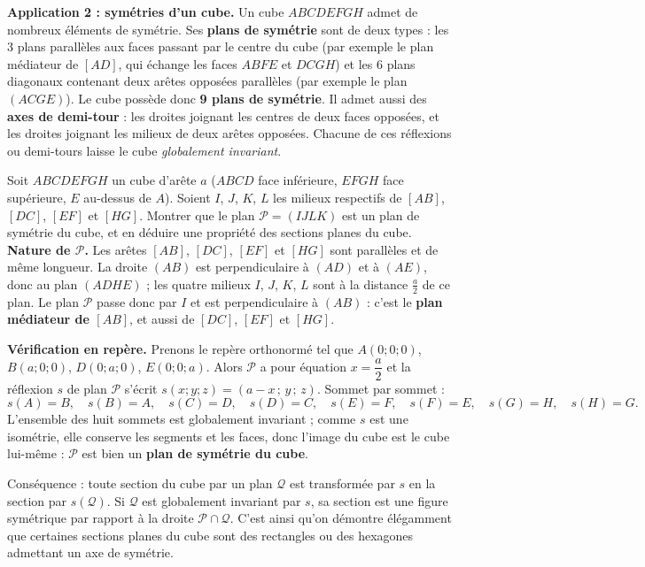 \documentclass[11pt]{article}
\begin{document}
\textbf{Application 2 : symétries d'un cube.} Un cube $ABCDEFGH$ admet de nombreux éléments de symétrie. Ses \textbf{plans de symétrie} sont de deux types : les 3 plans parallèles aux faces passant par le centre du cube (par exemple le plan médiateur de $[AD]$, qui échange les faces $ABFE$ et $DCGH$) et les 6 plans diagonaux contenant deux arêtes opposées parallèles (par exemple le plan $(ACGE)$). Le cube possède donc \textbf{9 plans de symétrie}. Il admet aussi des \textbf{axes de demi-tour} : les droites joignant les centres de deux faces opposées, et les droites joignant les milieux de deux arêtes opposées. Chacune de ces réflexions ou demi-tours laisse le cube \emph{globalement invariant}.

\begin{exoresolu}
Soit $ABCDEFGH$ un cube d'arête $a$ ($ABCD$ face inférieure, $EFGH$ face supérieure, $E$ au-dessus de $A$). Soient $I$, $J$, $K$, $L$ les milieux respectifs de $[AB]$, $[DC]$, $[EF]$ et $[HG]$. Montrer que le plan $\mathcal{P} = (IJLK)$ est un plan de symétrie du cube, et en déduire une propriété des sections planes du cube.
\tcblower
\textbf{Nature de $\mathcal{P}$.} Les arêtes $[AB]$, $[DC]$, $[EF]$ et $[HG]$ sont parallèles et de même longueur. La droite $(AB)$ est perpendiculaire à $(AD)$ et à $(AE)$, donc au plan $(ADHE)$ ; les quatre milieux $I$, $J$, $K$, $L$ sont à la distance $\frac{a}{2}$ de ce plan. Le plan $\mathcal{P}$ passe donc par $I$ et est perpendiculaire à $(AB)$ : c'est le \textbf{plan médiateur de $[AB]$}, et aussi de $[DC]$, $[EF]$ et $[HG]$.

\textbf{Vérification en repère.} Prenons le repère orthonormé tel que $A(0;0;0)$, $B(a;0;0)$, $D(0;a;0)$, $E(0;0;a)$. Alors $\mathcal{P}$ a pour équation $x = \dfrac{a}{2}$ et la réflexion $s$ de plan $\mathcal{P}$ s'écrit $s(x;y;z) = (a - x\,;\,y\,;\,z)$. Sommet par sommet :
\[
s(A) = B,\quad s(B) = A,\quad s(C) = D,\quad s(D) = C,\quad s(E) = F,\quad s(F) = E,\quad s(G) = H,\quad s(H) = G.
\]
L'ensemble des huit sommets est globalement invariant ; comme $s$ est une isométrie, elle conserve les segments et les faces, donc l'image du cube est le cube lui-même : $\mathcal{P}$ est bien un \textbf{plan de symétrie du cube}.

Conséquence : toute section du cube par un plan $\mathcal{Q}$ est transformée par $s$ en la section par $s(\mathcal{Q})$. Si $\mathcal{Q}$ est globalement invariant par $s$, sa section est une figure symétrique par rapport à la droite $\mathcal{P} \cap \mathcal{Q}$. C'est ainsi qu'on démontre élégamment que certaines sections planes du cube sont des rectangles ou des hexagones admettant un axe de symétrie.
\end{exoresolu}
\end{document}
